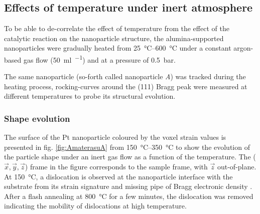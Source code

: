 \begin{table}[!htb]
\centering
{}
\caption{Example of algorithm chain used in BCDI for the phase retrieval.}
\label{tab:ReconstructionProcess}
\end{table}

\subsection{Effects of temperature under inert atmosphere}\label{sec:TempRampBCDI}

To be able to de-correlate the effect of temperature from the effect of the catalytic reaction on the nanoparticle structure, the alumina-supported nanoparticles were gradually heated from \qtyrange{25}{600}{\degreeCelsius} under a constant argon-based gas flow (\qty{50}{\ml\per\min}) and at a pressure of \qty{0.5}{\bar}.

The same nanoparticle (so-forth called nanoparticle \textit{A}) was tracked during the heating process, rocking-curves around the (111) Bragg peak were measured at different temperatures to probe its structural evolution.

\subsubsection{Shape evolution}

The surface of the Pt nanoparticle coloured by the voxel strain values is presented in fig. \ref{fig:AmaterasuA} from \qtyrange{150}{350}{\degreeCelsius} to show the evolution of the particle shape under an inert gas flow as a function of the temperature.
The ($\vec{x}, \vec{y}, \vec{z}$) frame in the figure corresponds to the sample frame, with $\vec{z}$ out-of-plane.
At \qty{150}{\degreeCelsius}, a dislocation is observed at the nanoparticle interface with the substrate from its strain signature and missing pipe of Bragg electronic density \parencite{Dupraz2015}.
After a flash annealing at \qty{800}{\degreeCelsius} for a few minutes, the dislocation was removed indicating the mobility of dislocations at high temperature.

